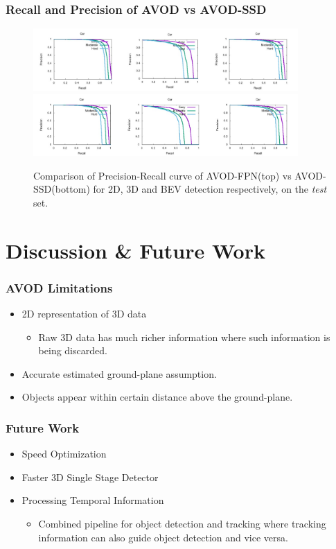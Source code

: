 \documentclass[10pt,fleqn,unknownkeysallowed]{beamer}
\begin{document}
\begin{frame}
   \frametitle{Recall and Precision of AVOD vs AVOD-SSD}
   \begin{figure}
   \begin{center}
   \includegraphics[width=0.9\textwidth]{images/avod_test_plots}\\
   \includegraphics[width=0.9\textwidth]{images/ssd_test_plots}
   \caption{Comparison of Precision-Recall curve of AVOD-FPN(top) vs AVOD-SSD(bottom) for 2D, 3D and BEV detection respectively, on the
      	\textit{test} set.}
   \end{center}
   \end{figure}
\end{frame}

\section{Discussion \& Future Work}
\begin{frame}
	\frametitle{AVOD Limitations}
	\linespread{1.5}
	\begin{itemize}
		\item{2D representation of 3D data}
		\begin{itemize}
			\item{Raw 3D data has much richer information where such information is being discarded.}
		\end{itemize}
		\item{Accurate estimated ground-plane assumption.}
		\item Objects appear within certain distance above the ground-plane.
	\end{itemize}
\end{frame}

\begin{frame}
	\frametitle{Future Work}
	\linespread{1.5}
	\begin{itemize}
		\item{Speed Optimization}
		\item{Faster 3D Single Stage Detector}
		\item{Processing Temporal Information}
		\begin{itemize}
			\item{Combined pipeline for object detection and tracking where tracking information can also guide object detection and vice versa.}
		\end{itemize}
	\end{itemize}
\end{frame}
\end{document}
